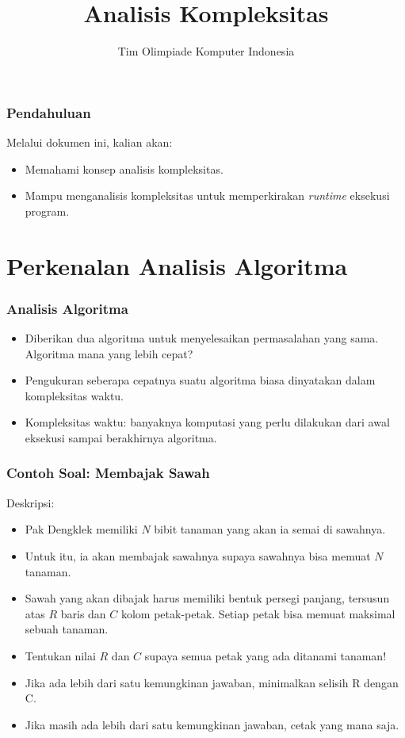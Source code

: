 

\title{Analisis Kompleksitas}
\author{Tim Olimpiade Komputer Indonesia}
\date{}



\begin{frame}
\titlepage
\end{frame}

\begin{frame}
\frametitle{Pendahuluan}
Melalui dokumen ini, kalian akan:
\begin{itemize}
  \item Memahami konsep analisis kompleksitas.
  \item Mampu menganalisis kompleksitas untuk memperkirakan \textit{runtime} eksekusi program.
\end{itemize}
\end{frame}

\section{Perkenalan Analisis Algoritma}
\frame{\sectionpage}

\begin{frame}
\frametitle{Analisis Algoritma}
\begin{itemize}
  \item Diberikan dua algoritma untuk menyelesaikan permasalahan yang sama. Algoritma mana yang lebih cepat?
  \item Pengukuran seberapa cepatnya suatu algoritma biasa dinyatakan dalam kompleksitas waktu.
  \item Kompleksitas waktu: banyaknya komputasi yang perlu dilakukan dari awal eksekusi sampai berakhirnya algoritma.
\end{itemize}
\end{frame}

\begin{frame}
\frametitle{Contoh Soal: Membajak Sawah}
Deskripsi:
\begin{itemize}
  \item Pak Dengklek memiliki $N$ bibit tanaman yang akan ia semai di sawahnya.
  \item Untuk itu, ia akan membajak sawahnya supaya sawahnya bisa memuat $N$ tanaman.
  \item Sawah yang akan dibajak harus memiliki bentuk persegi panjang, tersusun atas $R$ baris dan $C$ kolom petak-petak. Setiap petak bisa memuat maksimal sebuah tanaman.
  \item Tentukan nilai $R$ dan $C$ supaya semua petak yang ada ditanami tanaman!
  \item Jika ada lebih dari satu kemungkinan jawaban, minimalkan selisih R dengan C.
  \item Jika masih ada lebih dari satu kemungkinan jawaban, cetak yang mana saja.
\end{itemize}
\end{frame}

